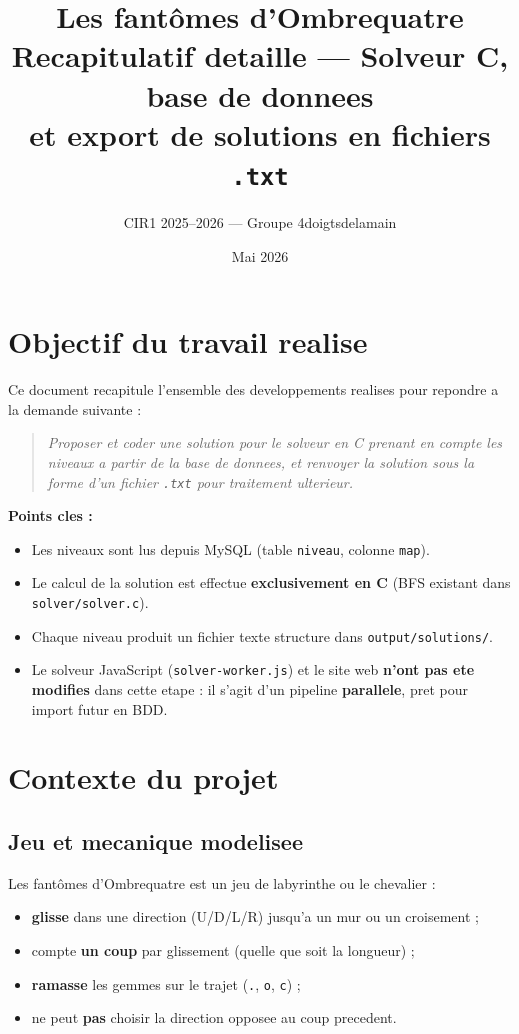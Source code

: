 \documentclass[11pt,a4paper]{article}
\title{%
  \textbf{Les fantômes d'Ombrequatre}\\[0.4em]
  \large Recapitulatif detaille --- Solveur C, base de donnees\\
  \large et export de solutions en fichiers \texttt{.txt}
}
\author{CIR1 2025--2026 --- Groupe 4doigtsdelamain}
\date{Mai 2026}
\begin{document}
\maketitle
\tableofcontents
\newpage

\section{Objectif du travail realise}

Ce document recapitule l'ensemble des developpements realises pour repondre a la demande suivante :

\begin{quote}
\textit{Proposer et coder une solution pour le solveur en C prenant en compte les niveaux a partir de la base de donnees, et renvoyer la solution sous la forme d'un fichier \texttt{.txt} pour traitement ulterieur.}
\end{quote}

\textbf{Points cles :}
\begin{itemize}
    \item Les niveaux sont lus depuis MySQL (table \texttt{niveau}, colonne \texttt{map}).
    \item Le calcul de la solution est effectue \textbf{exclusivement en C} (BFS existant dans \texttt{solver/solver.c}).
    \item Chaque niveau produit un fichier texte structure dans \texttt{output/solutions/}.
    \item Le solveur JavaScript (\texttt{solver-worker.js}) et le site web \textbf{n'ont pas ete modifies} dans cette etape : il s'agit d'un pipeline \textbf{parallele}, pret pour import futur en BDD.
\end{itemize}

\section{Contexte du projet}

\subsection{Jeu et mecanique modelisee}

Les fantômes d'Ombrequatre est un jeu de labyrinthe ou le chevalier :
\begin{itemize}
    \item \textbf{glisse} dans une direction (U/D/L/R) jusqu'a un mur ou un croisement ;
    \item compte \textbf{un coup} par glissement (quelle que soit la longueur) ;
    \item \textbf{ramasse} les gemmes sur le trajet (\texttt{.}, \texttt{o}, \texttt{c}) ;
    \item ne peut \textbf{pas} choisir la direction opposee au coup precedent.
\end{itemize}
\end{document}
